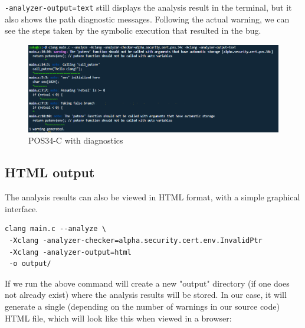 \lstinline{-analyzer-output=text} still displays the analysis result in the terminal, but it also shows the path diagnostic messages.
Following the actual warning, we can see the steps taken by the symbolic execution that resulted in the bug. 

\begin{figure}[H]
	\centering
	\includegraphics[width=\textwidth]{images/text.PNG}
	\caption{POS34-C with diagnostics}
	\label{fig:pos34termin2}
\end{figure}

\subsection{HTML output} \label{html-output}
The analysis results can also be viewed in HTML format, with a simple graphical interface. 

\begin{lstlisting}[caption={},label={lst:html-output}]
clang main.c --analyze \
 -Xclang -analyzer-checker=alpha.security.cert.env.InvalidPtr
 -Xclang -analyzer-output=html
 -o output/
\end{lstlisting}

If we run the above command will create a new "output" directory (if one does not already exist) where the analysis results will be stored. In our case, it will generate a single (depending on the number of warnings in our source code) HTML file, which will look like this when viewed in a browser: 


